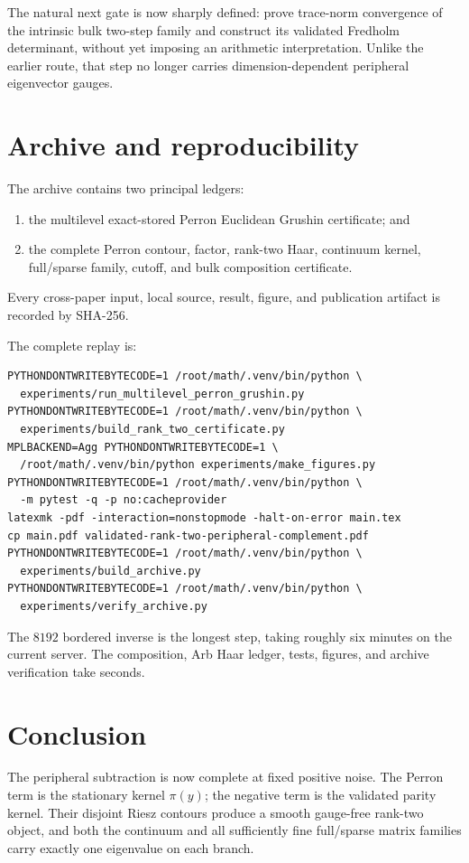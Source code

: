\documentclass[11pt]{article}
\theoremstyle{definition}
\theoremstyle{remark}
\begin{document}
The natural next gate is now sharply defined: prove trace-norm convergence
of the intrinsic bulk two-step family and construct its validated Fredholm
determinant, without yet imposing an arithmetic interpretation.  Unlike the
earlier route, that step no longer carries dimension-dependent peripheral
eigenvector gauges.

\section{Archive and reproducibility}
\label{sec:archive}

The archive contains two principal ledgers:
\begin{enumerate}[leftmargin=2em]
 \item the multilevel exact-stored Perron Euclidean Grushin certificate; and
 \item the complete Perron contour, factor, rank-two Haar, continuum kernel,
       full/sparse family, cutoff, and bulk composition certificate.
\end{enumerate}
Every cross-paper input, local source, result, figure, and publication
artifact is recorded by SHA-256.

The complete replay is:
\begin{verbatim}
PYTHONDONTWRITEBYTECODE=1 /root/math/.venv/bin/python \
  experiments/run_multilevel_perron_grushin.py
PYTHONDONTWRITEBYTECODE=1 /root/math/.venv/bin/python \
  experiments/build_rank_two_certificate.py
MPLBACKEND=Agg PYTHONDONTWRITEBYTECODE=1 \
  /root/math/.venv/bin/python experiments/make_figures.py
PYTHONDONTWRITEBYTECODE=1 /root/math/.venv/bin/python \
  -m pytest -q -p no:cacheprovider
latexmk -pdf -interaction=nonstopmode -halt-on-error main.tex
cp main.pdf validated-rank-two-peripheral-complement.pdf
PYTHONDONTWRITEBYTECODE=1 /root/math/.venv/bin/python \
  experiments/build_archive.py
PYTHONDONTWRITEBYTECODE=1 /root/math/.venv/bin/python \
  experiments/verify_archive.py
\end{verbatim}

The $8192$ bordered inverse is the longest step, taking roughly six minutes
on the current server.  The composition, Arb Haar ledger, tests, figures,
and archive verification take seconds.

\section{Conclusion}

The peripheral subtraction is now complete at fixed positive noise.  The
Perron term is the stationary kernel $\pi(y)$; the negative term is the
validated parity kernel.  Their disjoint Riesz contours produce a smooth
gauge-free rank-two object, and both the continuum and all sufficiently fine
full/sparse matrix families carry exactly one eigenvalue on each branch.
\end{document}
